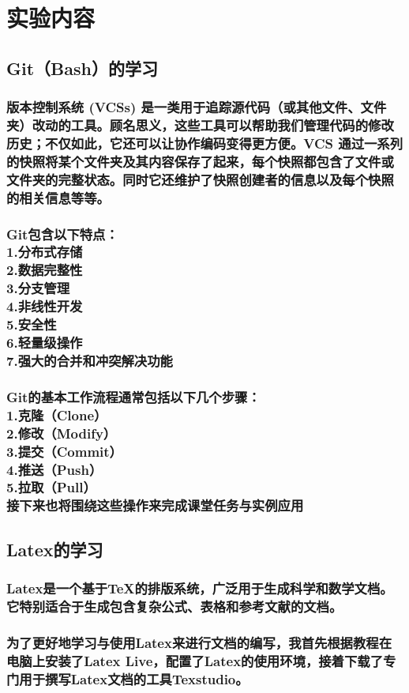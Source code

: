 \documentclass[UTF8,a4paper]{ctexart}
\begin{document}
\begin{sloppypar}
	\section{实验内容}
	\subsection{Git（Bash）的学习}
	\subsubsection{版本控制系统 (VCSs) 是一类用于追踪源代码（或其他文件、文件夹）改动的工具。顾名思义，这些工具可以帮助我们管理代码的修改历史；不仅如此，它还可以让协作编码变得更方便。VCS 通过一系列的快照将某个文件夹及其内容保存了起来，每个快照都包含了文件或文件夹的完整状态。同时它还维护了快照创建者的信息以及每个快照的相关信息等等。}
	\subsubsection{Git包含以下特点：\\1.分布式存储\\2.数据完整性\\3.分支管理\\4.非线性开发\\5.安全性\\6.轻量级操作\\7.强大的合并和冲突解决功能}
	\subsubsection{Git的基本工作流程通常包括以下几个步骤：\\1.克隆（Clone）\\2.修改（Modify）\\3.提交（Commit）\\4.推送（Push）\\5.拉取（Pull）\\接下来也将围绕这些操作来完成课堂任务与实例应用}
	\subsection{Latex的学习}
	\subsubsection{Latex是一个基于TeX的排版系统，广泛用于生成科学和数学文档。它特别适合于生成包含复杂公式、表格和参考文献的文档。}
	\subsubsection{为了更好地学习与使用Latex来进行文档的编写，我首先根据教程在电脑上安装了Latex Live，配置了Latex的使用环境，接着下载了专门用于撰写Latex文档的工具Texstudio。}

\end{sloppypar}
\end{document}
